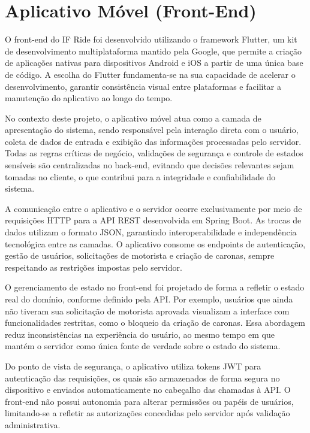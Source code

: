 \section{Aplicativo Móvel (Front-End)}

O front-end do IF Ride foi desenvolvido utilizando o framework Flutter, um kit de desenvolvimento multiplataforma mantido pela Google, que permite a criação de aplicações nativas para dispositivos Android e iOS a partir de uma única base de código. A escolha do Flutter fundamenta-se na sua capacidade de acelerar o desenvolvimento, garantir consistência visual entre plataformas e facilitar a manutenção do aplicativo ao longo do tempo.

No contexto deste projeto, o aplicativo móvel atua como a camada de apresentação do sistema, sendo responsável pela interação direta com o usuário, coleta de dados de entrada e exibição das informações processadas pelo servidor. Todas as regras críticas de negócio, validações de segurança e controle de estados sensíveis são centralizadas no back-end, evitando que decisões relevantes sejam tomadas no cliente, o que contribui para a integridade e confiabilidade do sistema.

A comunicação entre o aplicativo e o servidor ocorre exclusivamente por meio de requisições HTTP para a API REST desenvolvida em Spring Boot. As trocas de dados utilizam o formato JSON, garantindo interoperabilidade e independência tecnológica entre as camadas. O aplicativo consome os endpoints de autenticação, gestão de usuários, solicitações de motorista e criação de caronas, sempre respeitando as restrições impostas pelo servidor.

O gerenciamento de estado no front-end foi projetado de forma a refletir o estado real do domínio, conforme definido pela API. Por exemplo, usuários que ainda não tiveram sua solicitação de motorista aprovada visualizam a interface com funcionalidades restritas, como o bloqueio da criação de caronas. Essa abordagem reduz inconsistências na experiência do usuário, ao mesmo tempo em que mantém o servidor como única fonte de verdade sobre o estado do sistema.

Do ponto de vista de segurança, o aplicativo utiliza tokens JWT para autenticação das requisições, os quais são armazenados de forma segura no dispositivo e enviados automaticamente no cabeçalho das chamadas à API. O front-end não possui autonomia para alterar permissões ou papéis de usuários, limitando-se a refletir as autorizações concedidas pelo servidor após validação administrativa.


